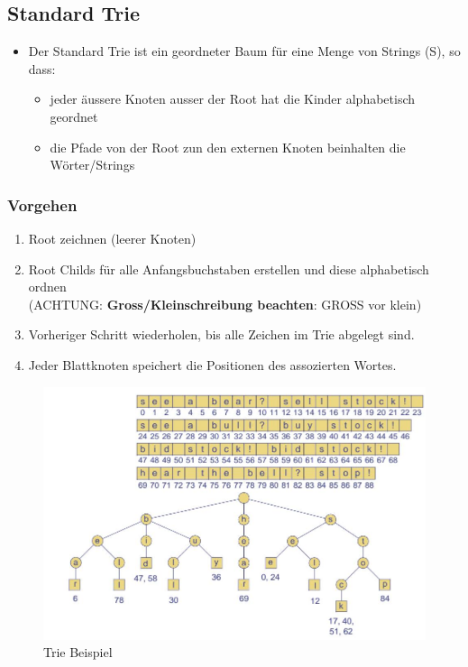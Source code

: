 \subsection{Standard Trie}
\begin{itemize}
	\item Der Standard Trie ist ein geordneter Baum für eine Menge von Strings (S), so dass:
	\begin{itemize}
		\item jeder äussere Knoten ausser der Root hat die Kinder alphabetisch geordnet
		\item die Pfade von der Root zun den externen Knoten beinhalten die Wörter/Strings
	\end{itemize}
\end{itemize}

\subsubsection{Vorgehen}
\begin{enumerate}
	\item Root zeichnen (leerer Knoten)
	\item Root Childs für alle Anfangsbuchstaben erstellen und diese alphabetisch ordnen \\ (ACHTUNG: \textbf{Gross/Kleinschreibung beachten}: GROSS vor klein)
	\item Vorheriger Schritt wiederholen, bis alle Zeichen im Trie abgelegt sind.
	\item Jeder Blattknoten speichert die Positionen des assozierten Wortes.
\end{enumerate}

\begin{figure}[h]
\centering
\includegraphics[width=0.8\linewidth]{images/trie_example}
\caption{Trie Beispiel}
\label{fig:trieexample}
\end{figure}


